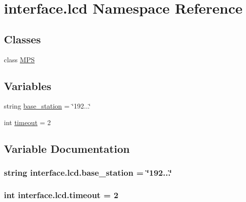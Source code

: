 \hypertarget{namespaceinterface_1_1lcd}{}\section{interface.\+lcd Namespace Reference}
\label{namespaceinterface_1_1lcd}
\subsection*{Classes}
\begin{DoxyCompactItemize}
\item 
class \hyperlink{classinterface_1_1lcd_1_1MPS}{M\+P\+S}
\end{DoxyCompactItemize}
\subsection*{Variables}
\begin{DoxyCompactItemize}
\item 
string \hyperlink{namespaceinterface_1_1lcd_aa894a538bef8baf28538703a7febc04f}{base\+\_\+station} = \char`\"{}192...\char`\"{}
\item 
int \hyperlink{namespaceinterface_1_1lcd_a8b9b984cbc82f678d686eaca48a1276d}{timeout} = 2
\end{DoxyCompactItemize}


\subsection{Variable Documentation}
\hypertarget{namespaceinterface_1_1lcd_aa894a538bef8baf28538703a7febc04f}{}
\subsubsection[{base\+\_\+station}]{\setlength{\rightskip}{0pt plus 5cm}string interface.\+lcd.\+base\+\_\+station = \char`\"{}192...\char`\"{}}\label{namespaceinterface_1_1lcd_aa894a538bef8baf28538703a7febc04f}
\hypertarget{namespaceinterface_1_1lcd_a8b9b984cbc82f678d686eaca48a1276d}{}
\subsubsection[{timeout}]{\setlength{\rightskip}{0pt plus 5cm}int interface.\+lcd.\+timeout = 2}\label{namespaceinterface_1_1lcd_a8b9b984cbc82f678d686eaca48a1276d}
